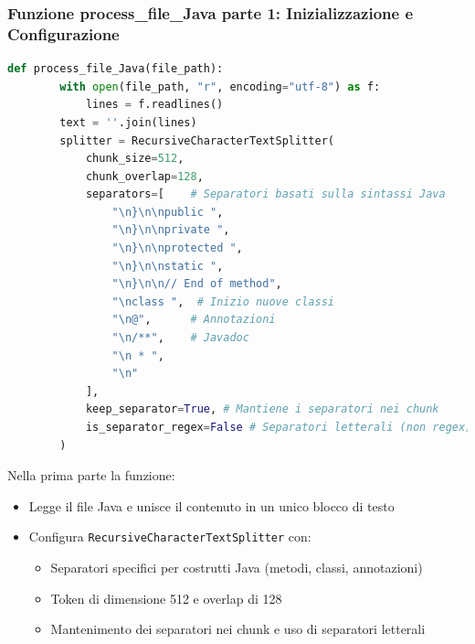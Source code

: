 \documentclass[12pt,a4paper,openright,twoside]{book}
\begin{document}
\subsubsection{Funzione process\_file\_Java parte 1: Inizializzazione e Configurazione}
\begin{lstlisting}[language=Python, caption={Configurazione dello splitter}]
    def process_file_Java(file_path):
        with open(file_path, "r", encoding="utf-8") as f:
            lines = f.readlines()
        text = ''.join(lines)
        splitter = RecursiveCharacterTextSplitter(
            chunk_size=512,
            chunk_overlap=128,
            separators=[    # Separatori basati sulla sintassi Java
                "\n}\n\npublic ",
                "\n}\n\nprivate ",
                "\n}\n\nprotected ",
                "\n}\n\nstatic ",
                "\n}\n\n// End of method", 
                "\nclass ",  # Inizio nuove classi
                "\n@",      # Annotazioni
                "\n/**",    # Javadoc
                "\n * ", 
                "\n"
            ],
            keep_separator=True, # Mantiene i separatori nei chunk
            is_separator_regex=False # Separatori letterali (non regex)
        )
\end{lstlisting}
Nella prima parte la funzione:
\begin{itemize}
    \item Legge il file Java e unisce il contenuto in un unico blocco di testo
    \item Configura \texttt{RecursiveCharacterTextSplitter} con:
    \begin{itemize}
        \item Separatori specifici per costrutti Java (metodi, classi, annotazioni)
        \item Token di dimensione 512 e overlap di 128
        \item Mantenimento dei separatori nei chunk e uso di separatori letterali
    \end{itemize}
\end{itemize}
\end{document}
